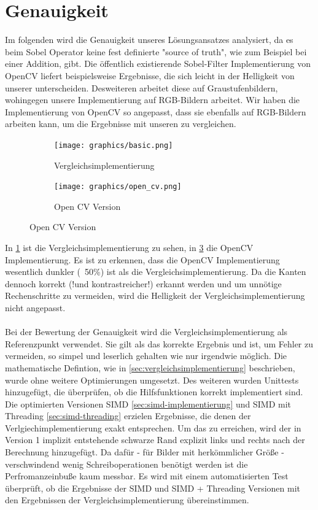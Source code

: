 \documentclass[course=erap]{aspdoc}
\begin{document}
\section{Genauigkeit}
Im folgenden wird die Genauigkeit unseres Lösungsansatzes analysiert, da es beim Sobel Operator keine fest definierte "source of truth", wie zum Beispiel bei einer Addition, gibt.
Die öffentlich existierende Sobel-Filter Implementierung von OpenCV liefert beispielsweise Ergebnisse, die sich leicht in der Helligkeit von unserer unterscheiden.
Desweiteren arbeitet diese auf Graustufenbildern, wohingegen unsere Implementierung auf RGB-Bildern arbeitet.
Wir haben die Implementierung von OpenCV so angepasst, dass sie ebenfalls auf RGB-Bildern arbeiten kann, um die Ergebnisse mit unseren zu vergleichen.
\begin{figure}[H]
    \begin{subfigure}{.5\columnwidth}
        \centering
        \texttt{[image: graphics/basic.png]}
        \caption{Vergleichsimplementierung}
        \label{fig:basic}
    \end{subfigure}
    \begin{subfigure}{.5\columnwidth}
        \centering
        \texttt{[image: graphics/open\_cv.png]}
        \caption{Open CV Version}
        \label{fig:opencv}
    \end{subfigure}
\end{figure}
In \ref{fig:basic} ist die Vergleichsimplementierung zu sehen, in \ref{fig:opencv} die OpenCV Implementierung.
Es ist zu erkennen, dass die OpenCV Implementierung wesentlich dunkler (~50\%) ist als die Vergleichsimplementierung.
Da die Kanten dennoch korrekt (!und kontrastreicher!) erkannt werden und um unnötige Rechenschritte zu vermeiden, wird die Helligkeit der Vergleichsimplementierung nicht angepasst.
\\\\
Bei der Bewertung der Genauigkeit wird die Vergleichsimplementierung als Referenzpunkt verwendet.
Sie gilt als das korrekte Ergebnis und ist, um Fehler zu vermeiden, so simpel und leserlich gehalten wie nur irgendwie möglich.
Die mathematische Defintion, wie in \ref{sec:vergleichsimplementierung} beschrieben, wurde ohne weitere Optimierungen umgesetzt.
Des weiteren wurden Unittests hinzugefügt, die überprüfen, ob die Hilfsfunktionen korrekt implementiert sind.
Die optimierten Versionen SIMD \ref{sec:simd-implementierung} und SIMD mit Threading \ref{sec:simd-threading} erzielen Ergebnisse, die denen der Verlgiechimplementierung exakt entsprechen.
Um das zu erreichen, wird der in Version 1 implizit entstehende schwarze Rand explizit links und rechts nach der Berechnung hinzugefügt.
Da dafür - für Bilder mit herkömmlicher Größe - verschwindend wenig Schreiboperationen benötigt werden ist die Perfromanzeinbuße kaum messbar.
Es wird mit einem automatisierten Test überprüft, ob die Ergebnisse der SIMD und SIMD + Threading Versionen mit den
Ergebnissen der Vergleichsimplementierung übereinstimmen.
\end{document}
